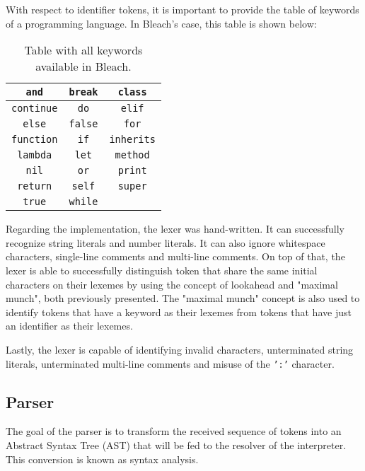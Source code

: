 With respect to identifier tokens, it is important to provide the table of keywords of a programming language. In Bleach's case, this table is shown below:
\begin{table}[H]
    \centering
    \begin{tabular}{|c|c|c|}
    \hline
    \texttt{and} & \texttt{break} & \texttt{class}  \\ \hline
    \texttt{continue} & \texttt{do} & \texttt{elif}  \\ \hline
    \texttt{else} & \texttt{false} & \texttt{for}  \\ \hline
    \texttt{function} & \texttt{if} & \texttt{inherits} \\ \hline
    \texttt{lambda} & \texttt{let} & \texttt{method} \\ \hline
    \texttt{nil} & \texttt{or} & \texttt{print} \\ \hline
    \texttt{return} & \texttt{self} & \texttt{super} \\ \hline
    \texttt{true} & \texttt{while} &  \\ \hline
    \end{tabular}
    \caption{Table with all keywords available in Bleach.}
\end{table}

Regarding the implementation, the lexer was hand-written. It can successfully recognize string literals and number literals. It can also ignore whitespace characters, single-line comments and multi-line comments. On top of that, the lexer is able to successfully distinguish token that share the same initial characters on their lexemes by using the concept of lookahead and "maximal munch", both previously presented. The "maximal munch" concept is also used to identify tokens that have a keyword as their lexemes from tokens that have just an identifier as their lexemes. 

Lastly, the lexer is capable of identifying invalid characters, unterminated string literals, unterminated multi-line comments and misuse of the \texttt{':'} character.


\subsection{Parser}
The goal of the parser is to transform the received sequence of tokens into an Abstract Syntax Tree (AST) that will be fed to the resolver of the interpreter. This conversion is known as syntax analysis.

